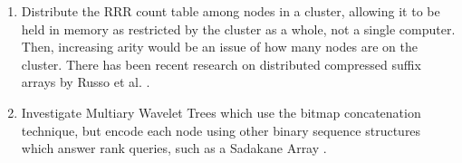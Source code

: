 \begin{enumerate}
\item
	Distribute the RRR count table among nodes in a cluster, allowing it to be
	held in memory as restricted by the cluster as a whole, not a single
	computer. Then, increasing arity would be an issue of how many nodes are
	on the cluster. There has been recent research on distributed compressed
	suffix arrays by Russo et al. \cite{russo2010}.

\item
	Investigate Multiary Wavelet Trees which use the bitmap concatenation 
	technique, but encode each node using other binary sequence structures which 
	answer rank queries, such as a Sadakane Array \cite{okanohara2006}.

\end{enumerate}